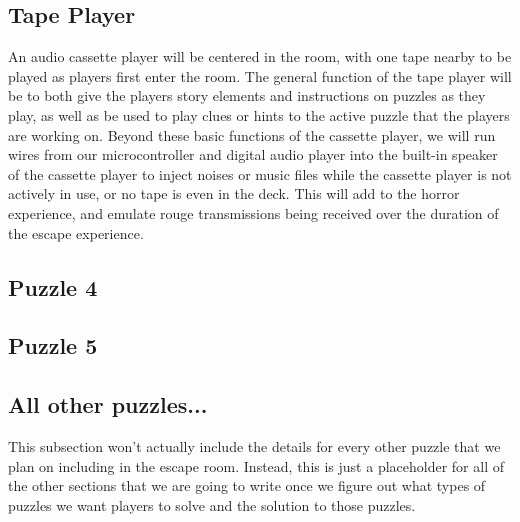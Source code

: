 \documentclass[conference]{IEEEtran}
\begin{document}
\subsection{Tape Player}
An audio cassette player will be centered in the room, with one tape nearby
to be played as players first enter the room. The general function of the tape
player will be to both give the players story elements and instructions on
puzzles as they play, as well as be used to play clues or hints to the active
puzzle that the players are working on. Beyond these basic functions of the
cassette player, we will run wires from our microcontroller and digital audio
player into the built-in speaker of the cassette player to inject noises or music
files while the cassette player is not actively in use, or no tape is even in the
deck. This will add to the horror experience, and emulate rouge transmissions
being received over the duration of the escape experience.

\subsection{Puzzle 4}

\subsection{Puzzle 5}

\subsection{All other puzzles...}
This subsection won't actually include the details for every other puzzle that we plan on including
in the escape room. Instead, this is just a placeholder for all of the other sections that we are
going to write once we figure out what types of puzzles we want players to solve and the solution
to those puzzles.
\end{document}
